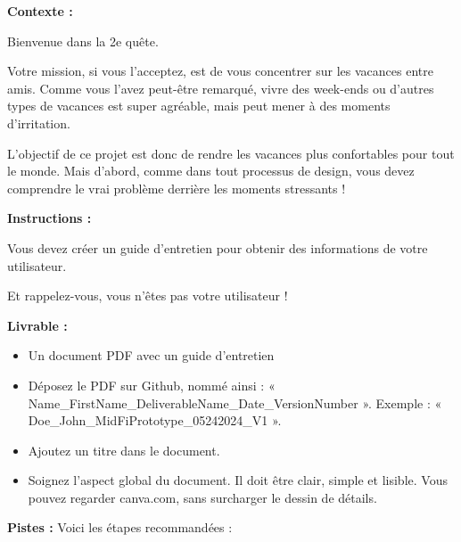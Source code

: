 \makeheaderfiles

\textbf{Contexte :}

Bienvenue dans la 2e quête.

Votre mission, si vous l'acceptez, est de vous concentrer sur les vacances entre amis. Comme vous l'avez peut-être remarqué, vivre des week-ends ou d'autres types de vacances est super agréable, mais peut mener à des moments d'irritation.

L'objectif de ce projet est donc de rendre les vacances plus confortables pour tout le monde. Mais d'abord, comme dans tout processus de design, vous devez comprendre le vrai problème derrière les moments stressants !

\textbf{Instructions :}

Vous devez créer un guide d'entretien pour obtenir des informations de votre utilisateur.

Et rappelez-vous, vous n'êtes pas votre utilisateur !

\textbf{Livrable :}

\begin{itemize}
\item Un document PDF avec un guide d'entretien
\item Déposez le PDF sur Github, nommé ainsi : « Name\_FirstName\_DeliverableName\_Date\_VersionNumber ». Exemple : « Doe\_John\_MidFiPrototype\_05242024\_V1 ».
\item Ajoutez un titre dans le document.
\item Soignez l'aspect global du document. Il doit être clair, simple et lisible. Vous pouvez regarder canva.com, sans surcharger le dessin de détails.
\end{itemize}

\textbf{Pistes :}
Voici les étapes recommandées :


